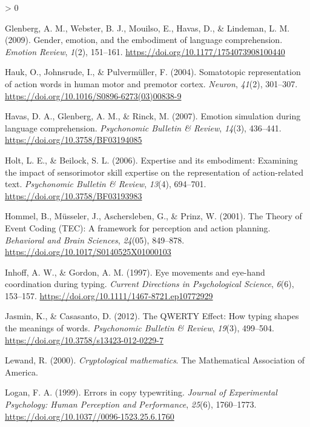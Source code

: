 \documentclass[
  english,
  man]{apa7}
\newlength{\cslhangindent}
\newenvironment{CSLReferences}[2] %
 {%
  \setlength{\parindent}{0pt}
  \ifodd #1 \everypar{\setlength{\hangindent}{\cslhangindent}}\ignorespaces\fi
  \ifnum #2 > 0
  \setlength{\parskip}{#2\baselineskip}
  \fi
 }%
 {}
\begin{document}
\begin{CSLReferences}{1}{0}
\leavevmode\hypertarget{ref-Glenberg2009}{}%
Glenberg, A. M., Webster, B. J., Mouilso, E., Havas, D., \& Lindeman, L. M. (2009). {Gender, emotion, and the embodiment of language comprehension}. \emph{Emotion Review}, \emph{1}(2), 151--161. \url{https://doi.org/10.1177/1754073908100440}

\leavevmode\hypertarget{ref-Hauk2004}{}%
Hauk, O., Johnsrude, I., \& Pulvermüller, F. (2004). {Somatotopic representation of action words in human motor and premotor cortex}. \emph{Neuron}, \emph{41}(2), 301--307. \url{https://doi.org/10.1016/S0896-6273(03)00838-9}

\leavevmode\hypertarget{ref-Havas2007}{}%
Havas, D. A., Glenberg, A. M., \& Rinck, M. (2007). {Emotion simulation during language comprehension}. \emph{Psychonomic Bulletin {\&} Review}, \emph{14}(3), 436--441. \url{https://doi.org/10.3758/BF03194085}

\leavevmode\hypertarget{ref-Holt2006}{}%
Holt, L. E., \& Beilock, S. L. (2006). {Expertise and its embodiment: Examining the impact of sensorimotor skill expertise on the representation of action-related text}. \emph{Psychonomic Bulletin {\&} Review}, \emph{13}(4), 694--701. \url{https://doi.org/10.3758/BF03193983}

\leavevmode\hypertarget{ref-Hommel2001}{}%
Hommel, B., Müsseler, J., Aschersleben, G., \& Prinz, W. (2001). {The Theory of Event Coding (TEC): A framework for perception and action planning}. \emph{Behavioral and Brain Sciences}, \emph{24}(05), 849--878. \url{https://doi.org/10.1017/S0140525X01000103}

\leavevmode\hypertarget{ref-Inhoff1997}{}%
Inhoff, A. W., \& Gordon, A. M. (1997). {Eye movements and eye-hand coordination during typing}. \emph{Current Directions in Psychological Science}, \emph{6}(6), 153--157. \url{https://doi.org/10.1111/1467-8721.ep10772929}

\leavevmode\hypertarget{ref-Jasmin2012}{}%
Jasmin, K., \& Casasanto, D. (2012). {The QWERTY Effect: How typing shapes the meanings of words.} \emph{Psychonomic Bulletin {\&} Review}, \emph{19}(3), 499--504. \url{https://doi.org/10.3758/s13423-012-0229-7}

\leavevmode\hypertarget{ref-Lewand2000}{}%
Lewand, R. (2000). \emph{{Cryptological mathematics}}. The Mathematical Association of America.

\leavevmode\hypertarget{ref-Logan1999}{}%
Logan, F. A. (1999). {Errors in copy typewriting}. \emph{Journal of Experimental Psychology: Human Perception and Performance}, \emph{25}(6), 1760--1773. \url{https://doi.org/10.1037//0096-1523.25.6.1760}


\end{CSLReferences}
\end{document}
